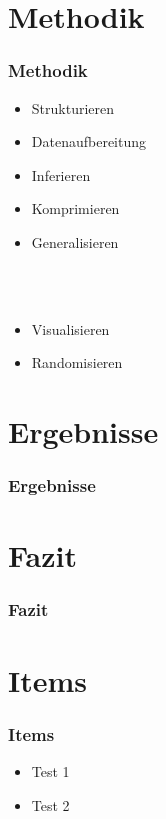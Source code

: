 \documentclass[12pt]{beamer}
\begin{document}
    \section{Methodik}
    \label{sec:methodik}
    \begin{frame}
        \frametitle{Methodik}

        \begin{itemize}
            \item Strukturieren
            \item Datenaufbereitung
            \item Inferieren
            \item Komprimieren
            \item Generalisieren
        \end{itemize}
        \\~\\
        \begin{itemize}
            \item Visualisieren
            \item Randomisieren
        \end{itemize}
    \end{frame}

    \section{Ergebnisse}
    \label{sec:ergebnisse}
    \begin{frame}
        \frametitle{Ergebnisse}
    \end{frame}

    \section{Fazit}
    \label{sec:fazit}
    \begin{frame}
        \frametitle{Fazit}
    \end{frame}

    \section{Items}
    \label{sec:items}
    \begin{frame}
        \frametitle{Items}

        \begin{itemize}
            \item<1-> Test 1
            \item<2-> Test 2
        \end{itemize}
    \end{frame}
\end{document}
